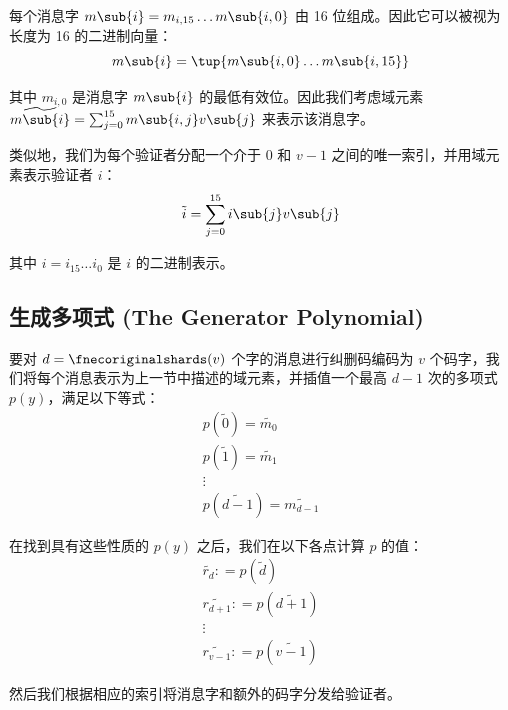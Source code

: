每个消息字 $m\sub{i}=m_{i, 15} \ldots m\sub{i, 0}$ 由 16 位组成。因此它可以被视为长度为 16 的二进制向量：
\begin{equation}
m\sub{i} = \tup{m\sub{i, 0} \ldots m\sub{i, 15}}
\end{equation}

其中 $m_{i, 0}$ 是消息字 $m\sub{i}$ 的最低有效位。因此我们考虑域元素 $\widetilde{m\sub{i}} = \sum^{15}_{j = 0} m\sub{i, j} v\sub{j}$ 来表示该消息字。

类似地，我们为每个验证者分配一个介于 0 和 $v - 1$ 之间的唯一索引，并用域元素表示验证者 $i$：
\begin{equation}
\tilde{i} = \sum^{15}_{j = 0} i\sub{j} v\sub{j}
\end{equation}

其中 $i = i_{15} \ldots i_0$ 是 $i$ 的二进制表示。

\subsection{生成多项式 (The Generator Polynomial)}

要对 $d = \fnecoriginalshards(v)$ 个字的消息进行纠删码编码为 $v$ 个码字，我们将每个消息表示为上一节中描述的域元素，并插值一个最高 $d - 1$ 次的多项式 $p(y)$，满足以下等式：
\begin{equation}
   \begin{array}{l}
     p (\tilde{0}) = \widetilde{m_0}\\
     p (\tilde{1}) = \widetilde{m_1}\\
     \vdots\\
     p (\widetilde{d-1}) = \widetilde{m_{d-1}}
   \end{array}
\end{equation}

在找到具有这些性质的 $p(y)$ 之后，我们在以下各点计算 $p$ 的值：
\begin{equation}
   \begin{array}{l}
     \widetilde{r_d} : = p (\widetilde{d})\\
     \widetilde{r_{d+1}} : = p (\widetilde{d+1})\\
     \vdots\\
     \widetilde{r_{v-1}} : = p (\widetilde{v-1})
   \end{array}
\end{equation}

然后我们根据相应的索引将消息字和额外的码字分发给验证者。


